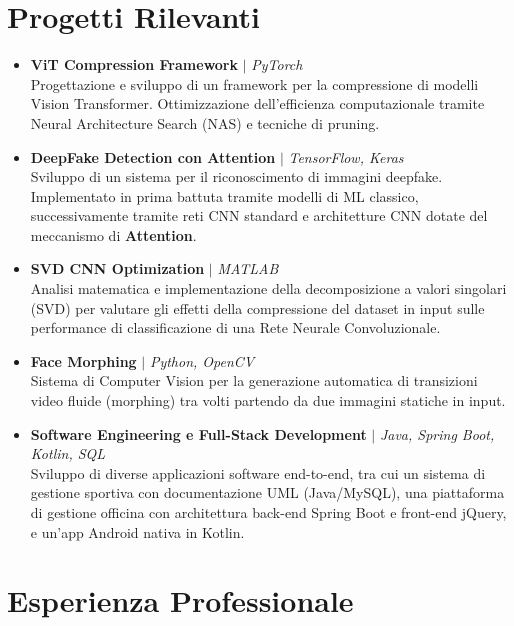 \documentclass[11pt, a4paper]{article}
\begin{document}
\section{Progetti Rilevanti}
\begin{itemize}
    \item \textbf{ViT Compression Framework} $|$ \textit{PyTorch} \\
    Progettazione e sviluppo di un framework per la compressione di modelli Vision Transformer. Ottimizzazione dell'efficienza computazionale tramite Neural Architecture Search (NAS) e tecniche di pruning.

    \item \textbf{DeepFake Detection con Attention} $|$ \textit{TensorFlow, Keras} \\
    Sviluppo di un sistema per il riconoscimento di immagini deepfake. Implementato in prima battuta tramite modelli di ML classico, successivamente tramite reti CNN standard e architetture CNN dotate del meccanismo di \textbf{Attention}.

    \item \textbf{SVD CNN Optimization} $|$ \textit{MATLAB} \\
    Analisi matematica e implementazione della decomposizione a valori singolari (SVD) per valutare gli effetti della compressione del dataset in input sulle performance di classificazione di una Rete Neurale Convoluzionale.

    \item \textbf{Face Morphing} $|$ \textit{Python, OpenCV} \\
    Sistema di Computer Vision per la generazione automatica di transizioni video fluide (morphing) tra volti partendo da due immagini statiche in input.

    \item \textbf{Software Engineering e Full-Stack Development} $|$ \textit{Java, Spring Boot, Kotlin, SQL} \\
    Sviluppo di diverse applicazioni software end-to-end, tra cui un sistema di gestione sportiva con documentazione UML (Java/MySQL), una piattaforma di gestione officina con architettura back-end Spring Boot e front-end jQuery, e un'app Android nativa in Kotlin.
\end{itemize}

\section{Esperienza Professionale}
\end{document}
